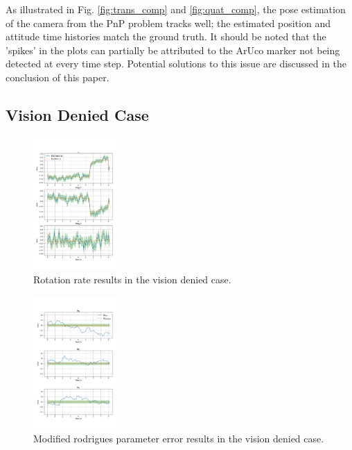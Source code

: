 \documentclass[conference]{IEEEtran}
\begin{document}
As illustrated in Fig. \ref{fig:trans_comp} and \ref{fig:quat_comp}, the pose estimation of the camera from the PnP problem tracks well; the estimated position and attitude time histories match the ground truth. 
It should be noted that the 'spikes' in the plots can partially be attributed to the ArUco marker not being detected at every time step.
Potential solutions to this issue are discussed in the conclusion of this paper.


\subsection{Vision Denied Case}

\begin{figure}[ht!] 
    \centerline{\includegraphics[width=0.3\textwidth]{omega_result_plot_vision_denied.png}}
    \caption{Rotation rate results in the vision denied case.}
    \label{fig:results_novision}
\end{figure}

\begin{figure}[ht!] 
    \centerline{\includegraphics[width=0.3\textwidth]{mrp_result_plot_vision_denied.png}}
    \caption{Modified rodrigues parameter error results in the vision denied case.}
    \label{fig:results_novision}
\end{figure}
\end{document}
